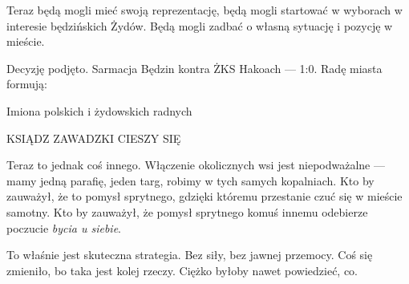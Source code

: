\documentclass[11pt,a4paper,oneside]{article}
\begin{document}
Teraz będą mogli mieć swoją reprezentację, będą mogli startować
w wyborach w interesie będzińskich Żydów. Będą mogli zadbać o własną
sytuację i pozycję w mieście. 

Decyzję podjęto. Sarmacja Będzin kontra ŻKS Hakoach --- 1:0. Radę
miasta formują:

{\color{red}Imiona polskich i żydowskich radnych}


\vspace{2cm}

KSIĄDZ ZAWADZKI CIESZY SIĘ

Teraz to jednak coś innego. Włączenie okolicznych wsi jest
niepodważalne --- mamy jedną parafię, jeden targ, robimy w  tych
samych kopalniach. Kto by zauważył, że to pomysł sprytnego, gdzięki
któremu przestanie czuć się w mieście samotny. Kto by zauważył, 
że pomysł sprytnego komuś innemu odebierze poczucie \emph{bycia u siebie}.

To właśnie jest skuteczna strategia. Bez siły, bez jawnej 
przemocy. Coś się zmieniło, bo taka jest kolej rzeczy. 
Ciężko byłoby nawet powiedzieć, co. 
\end{document}
